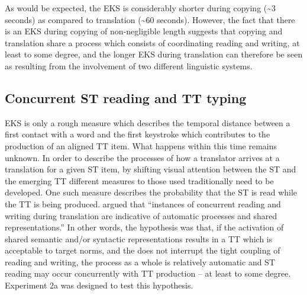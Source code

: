 \documentclass[output=paper]{LSP/langsci}
\begin{document}
\begin{table}
\begin{center}
\caption{LMEM results for the effect of LenSWord, STsegment, \mbox{Stseg\_nbr} and Task on EKS (experiment 1b)}
\label{schaeffer-carl:tab:2}
\end{center}
\end{table}
As would be expected, the EKS is considerably shorter during copying ({\textasciitilde}3 seconds) as compared to translation ({\textasciitilde}60 seconds). However, the fact that there is an EKS during copying of non-negligible length suggests that copying and translation share a process which consists of coordinating reading and writing, at least to some degree, and the longer EKS during translation can therefore be seen as resulting from the involvement of two different linguistic systems.

\subsection{Concurrent ST reading and TT typing}
EKS is only a rough measure which describes the temporal distance between a first contact with a word and the first keystroke which contributes to the production of an aligned TT item. What happens within this time  remains unknown. In order to describe the processes of how a translator arrives at a translation for a given ST item, by shifting visual attention between the ST and the emerging TT different  measures to those used traditionally need to be developed. One such measure describes the probability that the ST is read while the TT is being produced.  \citet[184]{Schaeffer2013Shared} argued that ``instances of concurrent reading and writing during translation are indicative of automatic processes and shared representations.'' In other words, the hypothesis was that, if the activation of shared semantic and/or syntactic representations results in a TT which is acceptable to target norms, and the  does not interrupt the tight coupling of reading and writing, the process as a whole is relatively automatic and ST reading may occur concurrently with TT production -- at least to some degree. Experiment 2a was designed to test this hypothesis.
\end{document}
